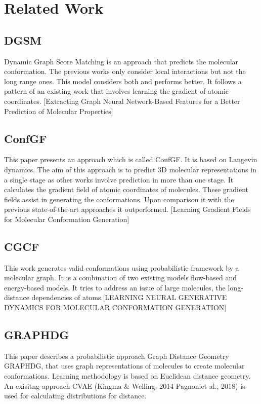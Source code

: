 \documentclass[rnd]{mas_proposal}
\begin{document}
\section{Related Work}

    \subsection{DGSM}
     Dynamic Graph Score Matching is an approach that predicts the molecular conformation. The previous works only consider local interactions but not the long range ones. This model considers both and performs better. It follows a pattern of an existing work that involves learning the gradient of atomic coordinates. [Extracting Graph Neural Network-Based Features for a Better Prediction of Molecular Properties]
     
     \subsection{ConfGF}
     This paper presents an approach which is called ConfGF. It is based on Langevin dynamics. The aim of this approach is to predict 3D molecular representations in a single stage as other works involve prediction in more than one stage. It calculates the gradient field of atomic coordinates of molecules. These gradient fields assist in generating the conformations. Upon comparison  it with the previous state-of-the-art approaches it outperformed. [Learning Gradient Fields for Molecular Conformation Generation] 
     
     \subsection{CGCF}
     This work generates valid conformations using probabilistic framework by a molecular graph. It is a combination of two existing models flow-based and energy-based models. It tries to address an issue of large molecules, the long-distance dependencies of atoms.[LEARNING NEURAL GENERATIVE DYNAMICS FOR MOLECULAR CONFORMATION GENERATION]
     
     \subsection{GRAPHDG }
     This paper describes a probabilistic approach Graph
    Distance Geometry GRAPHDG,  that uses graph representations of molecules to create molecular conformations. Learning methodology is based on Euclidean distance geometry. An exisitng approach CVAE (Kingma & Welling, 2014\; Pagnoniet al., 2018) is used for calculating distributions for distance.
     
\end{document}
